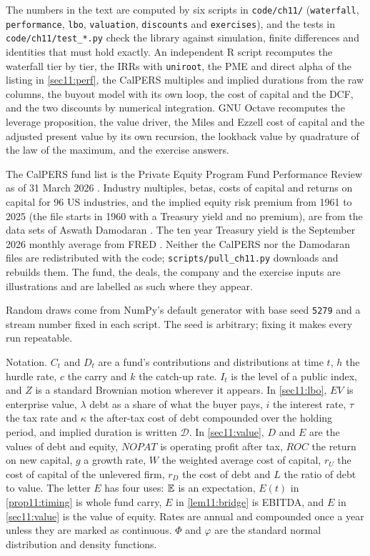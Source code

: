 \begin{chapterrefs}
\begin{keybox}
The numbers in the text are computed by six scripts in \texttt{code/ch11/} (\texttt{waterfall},
\texttt{performance}, \texttt{lbo}, \texttt{valuation}, \texttt{discounts} and \texttt{exercises}), and
the tests in \texttt{code/ch11/test\_*.py} check the library against simulation, finite differences and
identities that must hold exactly. An independent R script recomputes the waterfall tier by tier, the
IRRs with \texttt{uniroot}, the PME and direct alpha of the listing in \cref{sec11:perf}, the CalPERS
multiples and implied durations from the raw columns, the buyout model with its own loop, the cost of
capital and the DCF, and the two discounts by numerical integration. GNU Octave recomputes the
leverage proposition, the value driver, the Miles and Ezzell cost of capital and the adjusted present
value by its own recursion, the lookback value by quadrature of the law of the maximum, and the
exercise answers.

The CalPERS fund list is the Private Equity Program Fund Performance Review as of 31 March 2026
\parencite{calpers2026}. Industry multiples, betas, costs of capital and returns on capital for 96 US
industries, and the implied equity risk premium from 1961 to 2025 (the file starts in 1960 with a Treasury
yield and no premium), are from the data sets of
Aswath Damodaran \parencite{damodaran2026}. The ten year Treasury yield is the September 2026 monthly
average from FRED \parencite{fredch11}. Neither the CalPERS nor the Damodaran files are redistributed
with the code; \texttt{scripts/pull\_ch11.py} downloads and rebuilds them. The fund, the deals, the
company and the exercise inputs are illustrations and are labelled as such where they appear.

Random draws come from NumPy's default generator with base seed \texttt{5279} and a stream number fixed
in each script. The seed is arbitrary; fixing it makes every run repeatable.

Notation. $C_t$ and $D_t$ are a fund's contributions and distributions at time $t$, $h$ the hurdle
rate, $c$ the carry and $k$ the catch-up rate. $I_t$ is the level of a public index, and $Z$ is a standard Brownian motion wherever it appears. In
\cref{sec11:lbo}, $\mathit{EV}$ is enterprise value, $\lambda$ debt as a share of what the
buyer pays, $i$ the interest rate, $\tau$ the tax rate and $\kappa$ the after-tax cost of debt compounded
over the holding period, and implied duration is written $\mathcal D$. In \cref{sec11:value}, $D$
and $E$ are the values of debt and equity, $\mathit{NOPAT}$ is
operating profit after tax, $\mathit{ROC}$ the return on new capital, $g$ a growth rate, $W$ the
weighted average cost of capital, $r_U$ the cost of capital of the unlevered firm, $r_D$ the cost of
debt and $L$ the ratio of debt to value. The letter $E$ has four uses: $\mathbb{E}$ is an expectation,
$E(t)$ in \cref{prop11:timing} is whole fund carry, $E$ in \cref{lem11:bridge} is EBITDA, and $E$ in
\cref{sec11:value} is the value of equity. Rates are annual and compounded once a year unless they are
marked as continuous. $\Phi$ and $\varphi$ are the standard normal distribution and density functions.
\end{keybox}


\end{chapterrefs}
